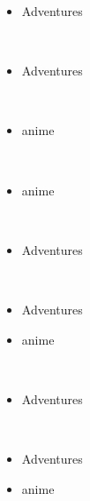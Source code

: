 \documentclass[a4paper,12pt]{article}
\begin{document}
\begin{itemize}
\item Adventures
\end{itemize}\\ \par \vspace{0.5cm}

\begin{itemize}
\item Adventures
\end{itemize}\\ \par \vspace{0.5cm}

\begin{itemize}
\item anime
\end{itemize}\\ \par \vspace{0.5cm}

\begin{itemize}
\item anime
\end{itemize}\\ \par \vspace{0.5cm}

\begin{itemize}
\item Adventures
\end{itemize}\\ \par \vspace{0.5cm}

\begin{itemize}
\item Adventures
\item anime
\end{itemize}\\ \par \vspace{0.5cm}

\begin{itemize}
\item Adventures
\end{itemize}\\ \par \vspace{0.5cm}

\begin{itemize}
\item Adventures
\item anime
\end{itemize}\\ \par \vspace{0.5cm}
\end{document}

